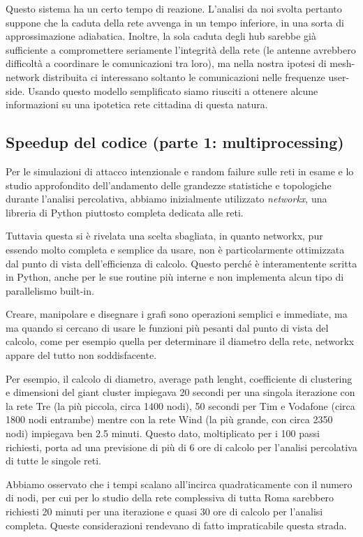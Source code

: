 Questo sistema ha un certo tempo di reazione. L'analisi da noi svolta pertanto suppone che la caduta della rete avvenga in un tempo inferiore, in una sorta di approssimazione adiabatica. Inoltre, la sola caduta degli hub sarebbe già sufficiente a compromettere seriamente l'integrità della rete (le antenne avrebbero difficoltà a coordinare le comunicazioni tra loro), ma nella nostra ipotesi di mesh-network distribuita ci interessano soltanto le comunicazioni nelle frequenze user-side. Usando questo modello semplificato siamo riusciti a ottenere alcune informazioni su una ipotetica rete cittadina di questa natura.

\subsection{Speedup del codice (parte 1: multiprocessing)}

Per le simulazioni di attacco intenzionale e random failure sulle reti in esame e lo studio approfondito dell'andamento delle grandezze statistiche e topologiche durante l'analisi percolativa, abbiamo inizialmente utilizzato \emph{networkx}, una libreria di Python piuttosto completa dedicata alle reti.

Tuttavia questa si è rivelata una scelta sbagliata, in quanto networkx, pur essendo molto completa e semplice da usare, non è particolarmente ottimizzata dal punto di vista dell'efficienza di calcolo. Questo perché è interamentente scritta in Python, anche per le sue routine più interne e non implementa alcun tipo di parallelismo built-in.

Creare, manipolare e disegnare i grafi sono operazioni semplici e immediate, ma ma quando si cercano di usare le funzioni più pesanti dal punto di vista del calcolo, come per esempio quella per determinare il diametro della rete, networkx appare del tutto non soddisfacente.

Per esempio, il calcolo di diametro, average path lenght, coefficiente di clustering e dimensioni del giant cluster impiegava 20 secondi per una singola iterazione con la rete Tre (la più piccola, circa 1400 nodi), 50 secondi per Tim e Vodafone (circa 1800 nodi entrambe) mentre con la rete Wind (la più grande, con circa 2350 nodi) impiegava ben 2.5 minuti. Questo dato, moltiplicato per i 100 passi richiesti, porta ad una previsione di più di 6 ore di calcolo per l'analisi percolativa di tutte le singole reti.

Abbiamo osservato che i tempi scalano all'incirca quadraticamente con il numero di nodi, per cui per lo studio della rete complessiva di tutta Roma sarebbero richiesti 20 minuti per una iterazione e quasi 30 ore di calcolo per l'analisi completa. Queste considerazioni rendevano di fatto impraticabile questa strada.

